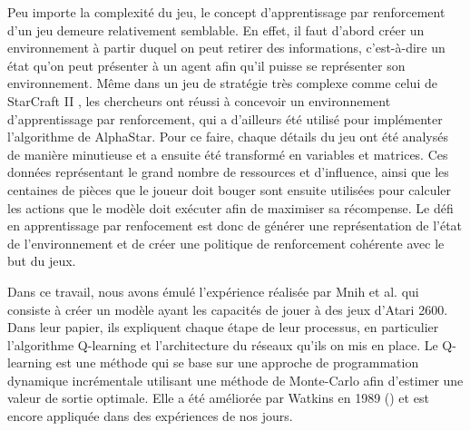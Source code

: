 \documentclass{article}
\begin{document}
Peu importe la complexité du jeu, le concept d'apprentissage par renforcement d'un jeu demeure relativement semblable. En effet, il faut d'abord créer un environnement à partir duquel on peut retirer des informations, c'est-à-dire un état
 qu'on peut présenter à un agent afin qu'il puisse se représenter son environnement. Même dans un jeu de stratégie très complexe comme celui de StarCraft II \cite{DBLP:journals/corr/abs-1708-04782}, les chercheurs ont réussi à concevoir un environnement d'apprentissage par renforcement, qui a d'ailleurs été utilisé pour implémenter l'algorithme de AlphaStar. Pour ce faire, chaque détails du jeu ont été analysés de manière minutieuse et a ensuite été transformé en variables et matrices. Ces données représentant le grand nombre de ressources et d'influence, ainsi que les centaines de pièces que le joueur doit bouger sont ensuite utilisées pour calculer les actions que le modèle doit exécuter afin de maximiser sa récompense. Le défi en apprentissage par renfocement est donc de générer une représentation de l'état de l'environnement et de créer une politique de renforcement cohérente avec le but du jeux. \linebreak

Dans ce travail, nous avons émulé l'expérience réalisée par Mnih et al. \cite{DBLP:journals/corr/MnihKSGAWR13} qui consiste à créer un modèle ayant les capacités de jouer à des jeux d'Atari 2600. Dans leur papier, ils expliquent chaque étape de leur processus, en particulier l'algorithme Q-learning et l'architecture du réseaux qu'ils on mis en place. Le Q-learning est une méthode qui se base sur une approche de programmation dynamique incrémentale utilisant une méthode de Monte-Carlo afin d'estimer une valeur de sortie optimale. Elle a été améliorée par Watkins en 1989 (\cite{article}) et est encore appliquée dans des expériences de nos jours. 
\end{document}
